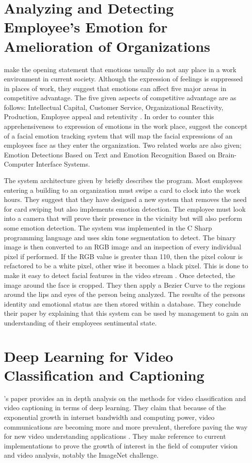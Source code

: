 
\section*{Analyzing and Detecting Employee's Emotion for Amelioration of Organizations}

\citeauthor{SUBHASHINI} make the opening statement that emotions usually do not any place in a work environment in current society. Although the expression of feelings is suppressed in places of work, they suggest that emotions can affect five major areas in competitive advantage. The five given aspects of competitive advantage are as follows: Intellectual Capital, Customer Service, Organizational Reactivity, Production, Employee appeal and retentivity \citep{SUBHASHINI}. In order to counter this apprehensiveness to expression of emotions in the work place, \citeauthor{SUBHASHINI} suggest the concept of a facial emotion tracking system that will map the facial expressions of an employees face as they enter the organization. Two related works are also given; Emotion Detections Based on Text and Emotion Recognition Based on Brain-Computer Interface Systems. 

The system architecture given by \citeauthor{SUBHASHINI} briefly describes the program. Most employees entering a building to an organization must swipe a card to clock into the work hours. They suggest that they have designed a new system that removes the need for card swiping but also implements emotion detection. The employee must look into a camera that will prove their presence in the vicinity but will also perform some emotion detection. The system was implemented in the C Sharp programming language and uses skin tone segmentation to detect. The binary image is then converted to an RGB image and an inspection of every individual pixel if performed. If the RGB value is greater than 110, then the pixel colour is refactored to be a white pixel, other wise it becomes a black pixel. This is done to make it easy to detect facial features in the video stream \citep{SUBHASHINI}. Once detected, the image around the face is cropped. They then apply a Bezier Curve to the regions around the lips and eyes of the person being analyzed. The results of the persons identity and emotional status are then stored within a database. They conclude their paper by explaining that this system can be used by management to gain an understanding of their employees sentimental state. 
\\
\section*{Deep Learning for Video Classiﬁcation and Captioning}
\citeauthor{Wu}'s paper provides an in depth analysis on the methods for video classification and video captioning in terms of deep learning. They claim that because of the exponential growth in internet bandwidth and computing power, video communications are becoming more and more prevalent, therefore paving the way for new video understanding applications \citep{Wu}. They make reference to current implementations to prove the growth of interest in the field of computer vision and video analysis, notably the ImageNet challenge. 

